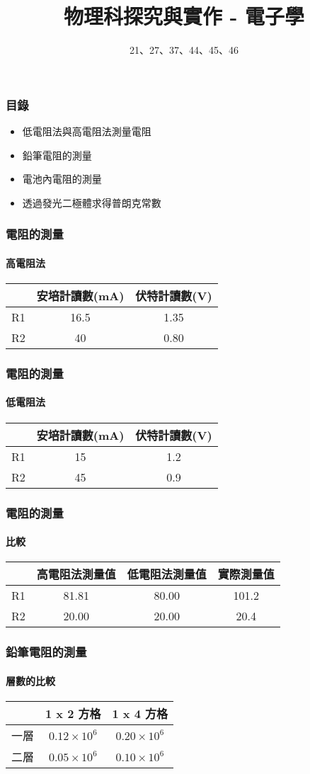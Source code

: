 \documentclass{beamer}
\begin{document}
\title{物理科探究與實作 - 電子學}
\author{21、27、37、44、45、46}

\frame{\titlepage}

\begin{frame}
	\frametitle{目錄}
	\begin{itemize}
		\item 低電阻法與高電阻法測量電阻
		\item 鉛筆電阻的測量
		\item 電池內電阻的測量
		\item 透過發光二極體求得普朗克常數
	\end{itemize}
\end{frame}

\centering
\begin{frame}
	\frametitle{電阻的測量}
	\framesubtitle{高電阻法}
	\begin{tabular}{|c|c|c|}
		\hline
		& 安培計讀數(mA) & 伏特計讀數(V) \\
		\hline
		R1 & 16.5 & 1.35 \\
		\hline
		R2 & 40 & 0.80 \\
		\hline
	\end{tabular}
\end{frame}



\begin{frame}
	\frametitle{電阻的測量}
	\framesubtitle{低電阻法}
	\begin{tabular}{|c|c|c|}
		\hline
		& 安培計讀數(mA) & 伏特計讀數(V) \\
		\hline
		R1 & 15 & 1.2 \\
		\hline
		R2 & 45 & 0.9 \\
		\hline
	\end{tabular}
\end{frame}

\begin{frame}
	\frametitle{電阻的測量}
	\framesubtitle{比較}
	\begin{tabular}{|c|c|c|c|}
		\hline
		& 高電阻法測量值 & 低電阻法測量值 & 實際測量值 \\
		\hline
		R1 & 81.81 & 80.00 & 101.2 \\
		\hline
		R2 & 20.00 & 20.00 & 20.4 \\
		\hline
	\end{tabular}
\end{frame}

\begin{frame}
	\frametitle{鉛筆電阻的測量}
	\framesubtitle{層數的比較}
	\begin{tabular}{|c|c|c|}
		\hline
		& 1 x 2 方格 & 1 x 4 方格  \\
		\hline
		一層 & $0.12 \times 10^6$ & $0.20 \times 10^6$  \\
		\hline
		二層 & $0.05 \times 10^6$ & $0.10 \times 10^6$  \\
		\hline
	\end{tabular}
\end{frame}
\end{document}
